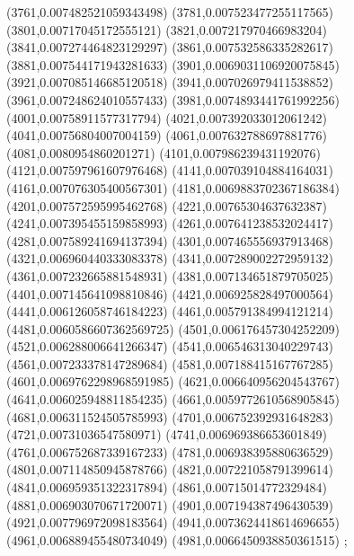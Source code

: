 {(3761,0.007482521059343498)
(3781,0.007523477255117565)
(3801,0.00717045172555121)
(3821,0.007217970466983204)
(3841,0.007274464823129297)
(3861,0.007532586335282617)
(3881,0.007544171943281633)
(3901,0.0069031106920075845)
(3921,0.007085146685120518)
(3941,0.007026979411538852)
(3961,0.007248624010557433)
(3981,0.0074893441761992256)
(4001,0.00758911577317794)
(4021,0.007392033012061242)
(4041,0.00756804007004159)
(4061,0.007632788697881776)
(4081,0.0080954860201271)
(4101,0.007986239431192076)
(4121,0.007597961607976468)
(4141,0.007039104884164031)
(4161,0.007076305400567301)
(4181,0.0069883702367186384)
(4201,0.007572595995462768)
(4221,0.00765304637632387)
(4241,0.007395455159858993)
(4261,0.007641238532024417)
(4281,0.007589241694137394)
(4301,0.007465556937913468)
(4321,0.006960440333083378)
(4341,0.007289002272959132)
(4361,0.007232665881548931)
(4381,0.007134651879705025)
(4401,0.007145641098810846)
(4421,0.006925828497000564)
(4441,0.006126058746184223)
(4461,0.005791384994121214)
(4481,0.0060586607362569725)
(4501,0.006176457304252209)
(4521,0.006288006641266347)
(4541,0.006546313040229743)
(4561,0.007233378147289684)
(4581,0.007188415167767285)
(4601,0.0069762298968591985)
(4621,0.006640956204543767)
(4641,0.006025948811854235)
(4661,0.0059772610568905845)
(4681,0.006311524505785993)
(4701,0.006752392931648283)
(4721,0.00731036547580971)
(4741,0.006969386653601849)
(4761,0.006752687339167233)
(4781,0.006938395880636529)
(4801,0.007114850945878766)
(4821,0.007221058791399614)
(4841,0.006959351322317894)
(4861,0.00715014772329484)
(4881,0.006903070671720071)
(4901,0.007194387496430539)
(4921,0.007796972098183564)
(4941,0.0073624418614696655)
(4961,0.006889455480734049)
(4981,0.0066450938850361515)
};
